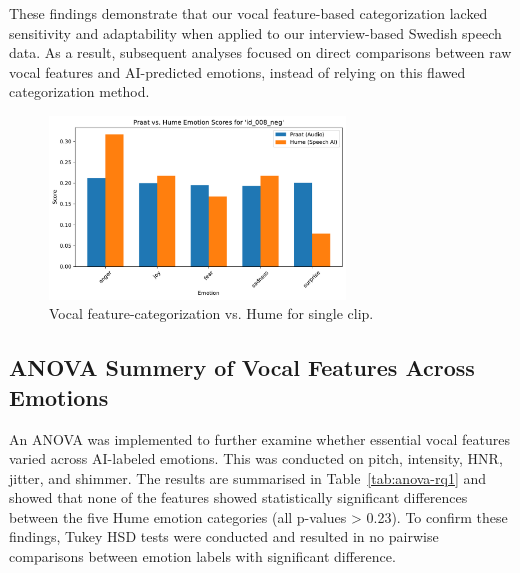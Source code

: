 These findings demonstrate that our vocal feature-based categorization lacked sensitivity and adaptability when applied to our interview-based Swedish speech data. As a result, subsequent analyses focused on direct comparisons between raw vocal features and AI-predicted emotions, instead of relying on this flawed categorization method. 
\begin{figure}[H]
    \centering
    \includegraphics[width=0.7\textwidth]{png/results/rq1/id_008_neg_praat_hume_comparison.pdf}
    \caption{Vocal feature-categorization vs. Hume for single clip.}
    \label{fig:praat_hume_008}
\end{figure}

\subsection{ANOVA Summery of Vocal Features Across Emotions}
An ANOVA was implemented to further examine whether essential vocal features varied across AI-labeled emotions. This was conducted on pitch, intensity, HNR, jitter, and shimmer. The results are summarised in Table~\ref{tab:anova-rq1} and showed that none of the features showed statistically significant differences between the five Hume emotion categories (all p-values > 0.23). To confirm these findings, Tukey HSD tests were conducted and resulted in no pairwise comparisons between emotion labels with significant difference. 

